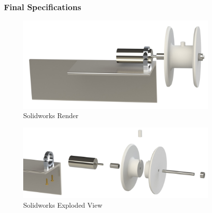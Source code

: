 \documentclass[10pt,a4paper]{article}
\begin{document}
\subsubsection{Final Specifications} 

\begin{figure}[h!]
	\centering
	\includegraphics[width=0.9\textwidth]{./figs/qd_render.jpg}
	\caption{Solidworks Render}
	\label{fig:qd_render}
\end{figure}
	 
\begin{figure}[h!]
	\centering
	\includegraphics[width=0.9\textwidth]{./figs/qd_exploded.jpg}
	\caption{Solidworks Exploded View}
	\label{fig:qd_exploded}
\end{figure}
\end{document}
